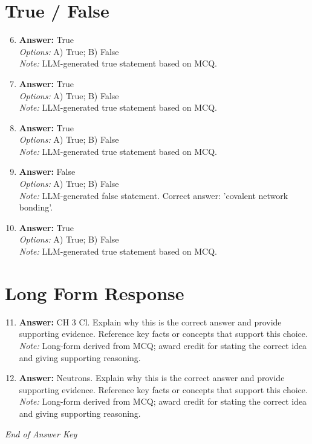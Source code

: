 \documentclass[12pt]{article}
\begin{document}
\section*{True / False}
\begin{enumerate}[label=\arabic*.]
\setcounter{enumi}{5}
\item \textbf{Answer:} True
\\ \textit{Options:} A) True; B) False
\\ \textit{Note:} LLM-generated true statement based on MCQ.
\item \textbf{Answer:} True
\\ \textit{Options:} A) True; B) False
\\ \textit{Note:} LLM-generated true statement based on MCQ.
\item \textbf{Answer:} True
\\ \textit{Options:} A) True; B) False
\\ \textit{Note:} LLM-generated true statement based on MCQ.
\item \textbf{Answer:} False
\\ \textit{Options:} A) True; B) False
\\ \textit{Note:} LLM-generated false statement. Correct answer: 'covalent network bonding'.
\item \textbf{Answer:} True
\\ \textit{Options:} A) True; B) False
\\ \textit{Note:} LLM-generated true statement based on MCQ.
\end{enumerate}

\section*{Long Form Response}
\begin{enumerate}[label=\arabic*.]
\setcounter{enumi}{10}
\item \textbf{Answer:} CH 3 Cl. Explain why this is the correct answer and provide supporting evidence. Reference key facts or concepts that support this choice.
\\ \textit{Note:} Long-form derived from MCQ; award credit for stating the correct idea and giving supporting reasoning.
\item \textbf{Answer:} Neutrons. Explain why this is the correct answer and provide supporting evidence. Reference key facts or concepts that support this choice.
\\ \textit{Note:} Long-form derived from MCQ; award credit for stating the correct idea and giving supporting reasoning.
\end{enumerate}

\vfill
\noindent\textit{End of Answer Key}
\end{document}
